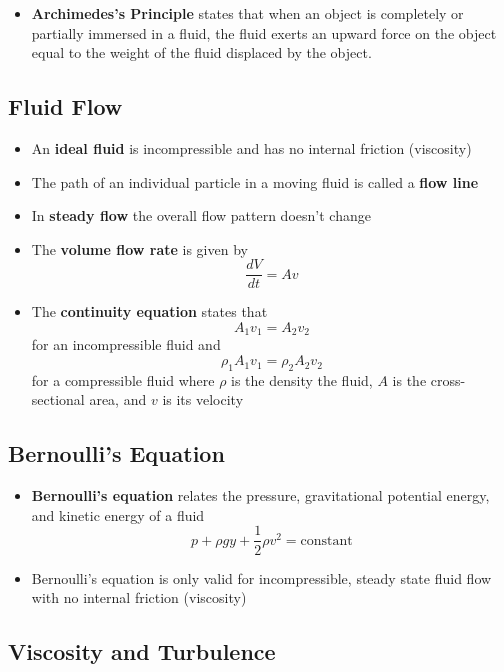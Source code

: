 \documentclass{article}
\begin{document}
\begin{itemize}
  \item \textbf{Archimedes's Principle} states that when an object is completely or partially immersed in a fluid, the fluid exerts an upward force on the object equal to the weight of the fluid displaced by the object.
\end{itemize}

\subsection{Fluid Flow}

\begin{itemize}
  \item An \textbf{ideal fluid} is incompressible and has no internal friction (viscosity)

  \item The path of an individual particle in a moving fluid is called a \textbf{flow line}

  \item In \textbf{steady flow} the overall flow pattern doesn't change

  \item The \textbf{volume flow rate} is given by \[\frac{dV}{dt}=Av\]

  \item The \textbf{continuity equation} states that \[A_1v_1=A_2v_2\] for an incompressible fluid and \[\rho_1A_1v_1=\rho_2A_2v_2\] for a compressible fluid where $\rho$ is the density the fluid, $A$ is the cross-sectional area, and $v$ is its velocity
\end{itemize}

\subsection{Bernoulli's Equation}

\begin{itemize}
  \item \textbf{Bernoulli's equation} relates the pressure, gravitational potential energy, and kinetic energy of a fluid \[p + \rho gy + \frac{1}{2}\rho v^2 = \textrm{constant}\]

  \item Bernoulli's equation is only valid for incompressible, steady state fluid flow with no internal friction (viscosity)
\end{itemize}

\subsection{Viscosity and Turbulence}
\end{document}
